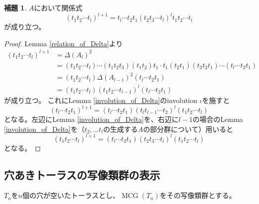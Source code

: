 \documentclass[uplatex, a4paper, dvipdfmx]{jsarticle}
\theoremstyle{definition}
\newtheorem{lemma}[theorem]{補題}
\DeclareMathOperator{\MCG}{\mathrm{MCG}}
\begin{document}
\begin{lemma}\label{relation_of_Delta_2}
    $A$において関係式
    \begin{equation}
        (t_1t_2\cdots t_l)^{l+1} = t_l\cdots t_2t_1 (t_2 t_3\cdots t_l)^l t_1t_2\cdots t_l
    \end{equation}
    が成り立つ。
\end{lemma}
\begin{proof}
    Lemma \ref{relation_of_Delta}より
    \begin{align}
        (t_1t_2\cdots t_l)^{l+1} & =\Delta(A_l)^2                                                                                         \\
                                 & = (t_1t_2\cdots t_l)\cdots(t_1t_2t_3)(t_1t_2)t_1 \cdot t_1 (t_2t_1)(t_3t_2t_1)\cdots(t_l\cdots t_2t_1) \\
                                 & = (t_1t_2\cdots t_l) \Delta(A_{l-1})^2(t_l\cdots t_2t_1)                                               \\
                                 & =(t_1t_2\cdots t_l) (t_1t_2\cdots t_{l-1})^{l}(t_l\cdots t_2t_1)
    \end{align}
    が成り立つ。
    これにLemma \ref{involution_of_Delta}のinvolution $\iota$を施すと
    \begin{equation}
        (t_l\cdots t_2t_1)^{l+1} = (t_l\cdots t_2t_1) (t_lt_{l-1}\cdots t_2)^{l}(t_1t_2\cdots t_l)
    \end{equation}
    となる。左辺にLemma \ref{involution_of_Delta}を、右辺に$l-1$の場合のLemma \ref{involution_of_Delta}を（$t_2, \dots t_l$の生成する$A$の部分群について）用いると
    \begin{equation}
        (t_1t_2\cdots t_l)^{l+1}=(t_l\cdots t_2t_1) (t_2t_3\cdots t_l)^{l}(t_1t_2\cdots t_l)
    \end{equation}
    となる。
\end{proof}
\subsection{穴あきトーラスの写像類群の表示}
$T_n$を$n$個の穴が空いたトーラスとし、$\MCG(T_n)$をその写像類群とする。
\end{document}
